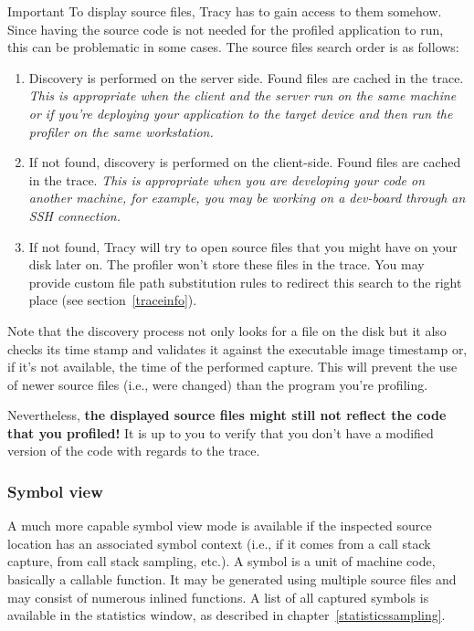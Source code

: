 \documentclass[hidelinks,titlepage,a4paper,twoside]{article}
\begin{document}
\begin{bclogo}[
noborder=true,
couleur=black!5,
logo=\bcbombe
]{Important}
To display source files, Tracy has to gain access to them somehow. Since having the source code is not needed for the profiled application to run, this can be problematic in some cases. The source files search order is as follows:

\begin{enumerate}
\item Discovery is performed on the server side. Found files are cached in the trace. \emph{This is appropriate when the client and the server run on the same machine or if you're deploying your application to the target device and then run the profiler on the same workstation.}
\item If not found, discovery is performed on the client-side. Found files are cached in the trace. \emph{This is appropriate when you are developing your code on another machine, for example, you may be working on a dev-board through an SSH connection.}
\item If not found, Tracy will try to open source files that you might have on your disk later on. The profiler won't store these files in the trace. You may provide custom file path substitution rules to redirect this search to the right place (see section~\ref{traceinfo}).
\end{enumerate}

Note that the discovery process not only looks for a file on the disk but it also checks its time stamp and validates it against the executable image timestamp or, if it's not available, the time of the performed capture. This will prevent the use of newer source files (i.e., were changed) than the program you're profiling.

Nevertheless, \textbf{the displayed source files might still not reflect the code that you profiled!} It is up to you to verify that you don't have a modified version of the code with regards to the trace.
\end{bclogo}

\subsubsection{Symbol view}
\label{symbolview}

A much more capable symbol view mode is available if the inspected source location has an associated symbol context (i.e., if it comes from a call stack capture, from call stack sampling, etc.). A symbol is a unit of machine code, basically a callable function. It may be generated using multiple source files and may consist of numerous inlined functions. A list of all captured symbols is available in the statistics window, as described in chapter~\ref{statisticssampling}.
\end{document}
